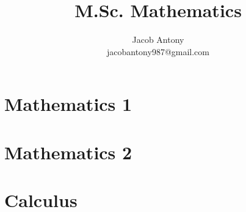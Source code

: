 \documentclass[a4paper,12pt,openany]{book}
\title{M.Sc. Mathematics}
\author{Jacob Antony\\jacobantony987@gmail.com}
\begin{document}
\tableofcontents

\part{Mathematics 1}



\part{Mathematics 2}
%



\part{Calculus}


%
%

%
%
%
\end{document}
